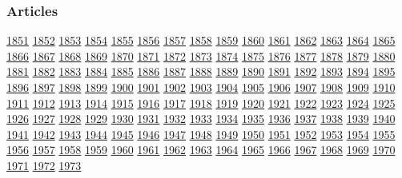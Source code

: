 \hypertarget{articles}{%
\subsubsection{Articles}\label{articles}}

\href{1851/}{1851} \href{1852/}{1852} \href{1853/}{1853}
\href{1854/}{1854} \href{1855/}{1855} \href{1856/}{1856}
\href{1857/}{1857} \href{1858/}{1858} \href{1859/}{1859}
\href{1860/}{1860} \href{1861/}{1861} \href{1862/}{1862}
\href{1863/}{1863} \href{1864/}{1864} \href{1865/}{1865}
\href{1866/}{1866} \href{1867/}{1867} \href{1868/}{1868}
\href{1869/}{1869} \href{1870/}{1870} \href{1871/}{1871}
\href{1872/}{1872} \href{1873/}{1873} \href{1874/}{1874}
\href{1875/}{1875} \href{1876/}{1876} \href{1877/}{1877}
\href{1878/}{1878} \href{1879/}{1879} \href{1880/}{1880}
\href{1881/}{1881} \href{1882/}{1882} \href{1883/}{1883}
\href{1884/}{1884} \href{1885/}{1885} \href{1886/}{1886}
\href{1887/}{1887} \href{1888/}{1888} \href{1889/}{1889}
\href{1890/}{1890} \href{1891/}{1891} \href{1892/}{1892}
\href{1893/}{1893} \href{1894/}{1894} \href{1895/}{1895}
\href{1896/}{1896} \href{1897/}{1897} \href{1898/}{1898}
\href{1899/}{1899} \href{1900/}{1900} \href{1901/}{1901}
\href{1902/}{1902} \href{1903/}{1903} \href{1904/}{1904}
\href{1905/}{1905} \href{1906/}{1906} \href{1907/}{1907}
\href{1908/}{1908} \href{1909/}{1909} \href{1910/}{1910}
\href{1911/}{1911} \href{1912/}{1912} \href{1913/}{1913}
\href{1914/}{1914} \href{1915/}{1915} \href{1916/}{1916}
\href{1917/}{1917} \href{1918/}{1918} \href{1919/}{1919}
\href{1920/}{1920} \href{1921/}{1921} \href{1922/}{1922}
\href{1923/}{1923} \href{1924/}{1924} \href{1925/}{1925}
\href{1926/}{1926} \href{1927/}{1927} \href{1928/}{1928}
\href{1929/}{1929} \href{1930/}{1930} \href{1931/}{1931}
\href{1932/}{1932} \href{1933/}{1933} \href{1934/}{1934}
\href{1935/}{1935} \href{1936/}{1936} \href{1937/}{1937}
\href{1938/}{1938} \href{1939/}{1939} \href{1940/}{1940}
\href{1941/}{1941} \href{1942/}{1942} \href{1943/}{1943}
\href{1944/}{1944} \href{1945/}{1945} \href{1946/}{1946}
\href{1947/}{1947} \href{1948/}{1948} \href{1949/}{1949}
\href{1950/}{1950} \href{1951/}{1951} \href{1952/}{1952}
\href{1953/}{1953} \href{1954/}{1954} \href{1955/}{1955}
\href{1956/}{1956} \href{1957/}{1957} \href{1958/}{1958}
\href{1959/}{1959} \href{1960/}{1960} \href{1961/}{1961}
\href{1962/}{1962} \href{1963/}{1963} \href{1964/}{1964}
\href{1965/}{1965} \href{1966/}{1966} \href{1967/}{1967}
\href{1968/}{1968} \href{1969/}{1969} \href{1970/}{1970}
\href{1971/}{1971} \href{1972/}{1972} \href{1973/}{1973}
